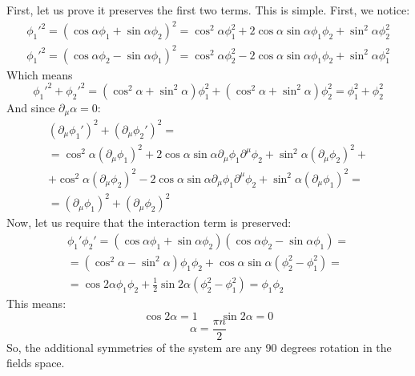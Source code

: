 \documentclass{article}
\begin{document}
First, let us prove it preserves the first two terms. This is simple. First, we notice:
\begin{equation}
\begin{gathered}
    \phi_1'^2 = (\cos\alpha \phi_1 + \sin\alpha \phi_2)^2 = \cos^2\alpha \phi_1^2 + 2\cos\alpha\sin\alpha\phi_1\phi_2 + \sin^2\alpha\phi_2^2
    \\
    \phi_1'^2 = (\cos\alpha \phi_2 - \sin\alpha \phi_1)^2 = \cos^2\alpha \phi_2^2 - 2\cos\alpha\sin\alpha\phi_1\phi_2 + \sin^2\alpha\phi_1^2
\end{gathered}
\end{equation}
Which means
\begin{equation}
    \phi_1'^2 + \phi_2'^2 = (\cos^2\alpha + \sin^2\alpha)\phi_1^2 + (\cos^2\alpha + \sin^2\alpha)\phi_2^2 = \phi_1^2 + \phi_2^2
\end{equation}
And since $\partial_\mu \alpha = 0$:
\begin{equation}
\begin{gathered}
    \left(\partial_\mu\phi_1'\right)^2 + \left(\partial_\mu\phi_2'\right)^2 = \\ = \cos^2\alpha \left(\partial_\mu\phi_1\right)^2 + 2\cos\alpha\sin\alpha\partial_\mu\phi_1\partial^\mu\phi_2 + \sin^2\alpha\left(\partial_\mu\phi_2\right)^2 + \\ +
    \cos^2\alpha \left(\partial_\mu\phi_2\right)^2 - 2\cos\alpha\sin\alpha\partial_\mu\phi_1\partial^\mu\phi_2 + \sin^2\alpha\left(\partial_\mu\phi_1\right)^2 = \\ =
    \left(\partial_\mu\phi_1\right)^2 + \left(\partial_\mu\phi_2\right)^2
\end{gathered}
\end{equation}
Now, let us require that the interaction term is preserved:
\begin{equation}
\begin{gathered}
    \phi_1'\phi_2' = (\cos\alpha\phi_1 + \sin\alpha\phi_2)(\cos\alpha\phi_2 - \sin\alpha\phi_1) = \\ = (\cos^2\alpha - \sin^2\alpha)\phi_1\phi_2 + \cos\alpha\sin\alpha(\phi_2^2 - \phi_1^2) = \\ =
    \cos2\alpha\phi_1\phi_2 + \frac{1}{2}\sin2\alpha(\phi_2^2 - \phi_1^2) = \phi_1\phi_2
\end{gathered}
\end{equation}
This means:
\begin{equation}
    \cos2\alpha = 1 \qquad \sin2\alpha = 0
\end{equation}
\begin{equation}
    \alpha = \frac{\pi n}{2}
\end{equation}
So, the additional symmetries of the system are any 90 degrees rotation in the fields space.
\end{document}
